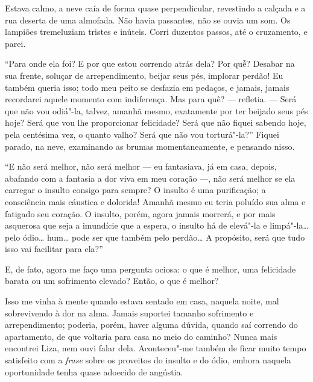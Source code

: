 Estava calmo, a neve caía de forma quase perpendicular, revestindo a
calçada e a rua deserta de uma almofada. Não havia passantes, não se
ouvia um som. Os lampiões tremeluziam tristes e inúteis. Corri duzentos
passos, até o cruzamento, e parei.

``Para onde ela foi? E por que estou correndo atrás dela? Por quễ?
Desabar na sua frente, soluçar de arrependimento, beijar seus pés,
implorar perdão! Eu também queria isso; todo meu peito se desfazia em
pedaços, e jamais, jamais recordarei aquele momento com indiferença. Mas
para quê? --- refletia. --- Será que não vou odiá"-la, talvez, amanhã mesmo,
exatamente por ter beijado seus pés hoje? Será que vou lhe proporcionar
felicidade? Será que não fiquei sabendo hoje, pela centésima vez, o
quanto valho? Será que não vou torturá"-la?'' Fiquei parado, na neve,
examinando as brumas momentaneamente, e pensando nisso.

``E não será melhor, não será melhor --- eu fantasiava, já em casa,
depois, abafando com a fantasia a dor viva em meu coração ---, não será
melhor se ela carregar o insulto consigo para sempre? O insulto é uma
purificação; a consciência mais cáustica e dolorida! Amanhã mesmo eu
teria poluído sua alma e fatigado seu coração. O insulto, porém, agora
jamais morrerá, e por mais asquerosa que seja a imundície que a espera,
o insulto há de elevá"-la e limpá"-la\ldots{} pelo ódio\ldots{} hum\ldots{} pode ser que
também pelo perdão\ldots{} A propósito, será que tudo isso vai facilitar para
ela?''

E, de fato, agora me faço uma pergunta ociosa: o que é melhor, uma
felicidade barata ou um sofrimento elevado? Então, o que é melhor?

Isso me vinha à mente quando estava sentado em casa, naquela noite, mal
sobrevivendo à dor na alma. Jamais suportei tamanho sofrimento e
arrependimento; poderia, porém, haver alguma dúvida, quando saí correndo
do apartamento, de que voltaria para casa no meio do caminho? Nunca mais
encontrei Liza, nem ouvi falar dela. Aconteceu"-me também de ficar muito
tempo satisfeito com a \emph{frase} sobre os proveitos do insulto e do
ódio, embora naquela oportunidade tenha quase adoecido de angústia.


